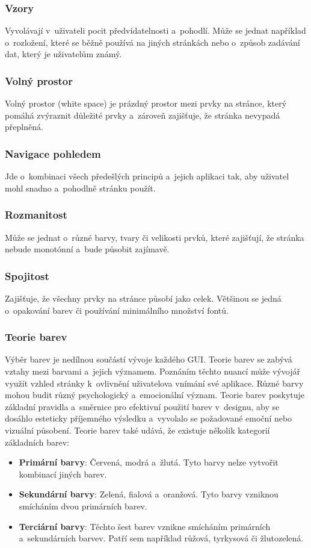 \subsubsection*{Vzory}
Vyvolávají v~uživateli pocit předvídatelnosti a~pohodlí. Může se jednat například o~rozložení, které se běžně používá na jiných stránkách nebo o~způsob zadávání dat, který je uživatelům známý.

\subsubsection*{Volný prostor}
Volný prostor (white space) je prázdný prostor mezi prvky na stránce, který pomáhá zvýraznit důležité prvky a~zároveň zajišťuje, že stránka nevypadá přeplněná.

\subsubsection*{Navigace pohledem}
Jde o~kombinaci všech předešlých principů a~jejich aplikaci tak, aby uživatel mohl snadno a~pohodlně stránku použít.

\subsubsection*{Rozmanitost}
Může se jednat o~různé barvy, tvary či velikosti prvků, které zajišťují, že stránka nebude monotónní a~bude působit zajímavě.

\subsubsection*{Spojitost}
Zajišťuje, že všechny prvky na stránce působí jako celek. Většinou se jedná o~opakování barev či používání minimálního množství fontů.

\subsubsection{Teorie barev}
Výběr barev je nedílnou součástí vývoje každého GUI. Teorie barev se zabývá vztahy mezi barvami a~jejich významem. Poznáním těchto nuancí může vývojář využít vzhled stránky k~ovlivnění uživatelova vnímání své aplikace. Různé barvy mohou budit různý psychologický a~emocionální význam. Teorie barev poskytuje základní pravidla a~směrnice pro efektivní použití barev v~designu, aby se dosáhlo esteticky příjemného výsledku a~vyvolalo se požadované emoční nebo vizuální působení. Teorie barev také udává, že existuje několik kategorií základních barev:
\begin{itemize}
    \item \textbf{Primární barvy}: Červená, modrá a~žlutá. Tyto barvy nelze vytvořit kombinací jiných barev.
    \item \textbf{Sekundární barvy}: Zelená, fialová a~oranžová. Tyto barvy vzniknou smícháním dvou primárních barev.
    \item \textbf{Terciární barvy}: Těchto šest barev vznikne smícháním primárních a~sekundárních barvev. Patří sem například růžová, tyrkysová či žlutozelená.
\end{itemize}


